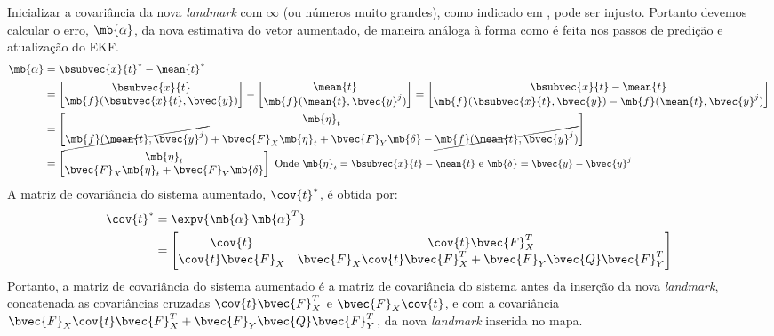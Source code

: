 Inicializar a covariância da nova \textit{landmark} com $\infty$ (ou 
números muito grandes), como indicado em 
\cite[p.~317]{bongard2006probabilistic}, pode ser injusto. Portanto devemos 
calcular o erro, $\mb{\alpha}$, da nova estimativa do vetor aumentado, de 
maneira análoga à forma como é feita nos passos de predição e atualização 
do EKF. 
\begin{equation}
\begin{aligned}
   \mb{\alpha} &= \bsubvec{x}{t}^* - \mean{t}^*\\
   &= \begin{bmatrix}
       \bsubvec{x}{t} \\ \mb{f}(\bsubvec{x}{t}, \bvec{y})
   \end{bmatrix} - \begin{bmatrix}
       \mean{t} \\ \mb{f}(\mean{t}, \bvec{y}^j)
   \end{bmatrix} = \begin{bmatrix}
       \bsubvec{x}{t} - \mean{t}\\
       \mb{f}(\bsubvec{x}{t}, \bvec{y}) - \mb{f}(\mean{t}, \bvec{y}^j)
   \end{bmatrix}\\
   &= \begin{bmatrix}
       \mb{\eta}_t \\
       \cancel{\mb{f}(\mean{t}, \bvec{y}^j)} + 
       \bvec{F}_X \mb{\eta}_t + \bvec{F}_Y \mb{\delta}
       - \cancel{\mb{f}(\mean{t}, \bvec{y}^j)}
   \end{bmatrix} \\
    &= \begin{bmatrix}
       \mb{\eta}_t \\
       \bvec{F}_X \mb{\eta}_t + \bvec{F}_Y \mb{\delta} 
   \end{bmatrix} \small\text{ Onde $\mb{\eta}_t = \bsubvec{x}{t} - \mean{t}$ e $\mb{\delta} = \bvec{y} - \bvec{y}^j$}
\end{aligned}
\end{equation}
A matriz de covariância do sistema aumentado, $\cov{t}^*$, é obtida por:
\renewcommand{\arraystretch}{1.5}
\begin{equation}
\begin{aligned}
  \cov{t}^* &= \expv{\mb{\alpha} \,\mb{\alpha}^T} \\
  &= \begin{bmatrix}
       \cov{t} & \cov{t} \bvec{F}_X^T\\
       \cov{t} \bvec{F}_X &  \bvec{F}_X \cov{t} \bvec{F}_X^T 
       + \bvec{F}_Y \bvec{Q} \bvec{F}_Y^T
    \end{bmatrix}
\end{aligned}
\end{equation}
\renewcommand{\arraystretch}{1}
Portanto, a matriz de covariância do sistema aumentado é a matriz de 
covariância do sistema antes da inserção da nova \textit{landmark}, 
concatenada as covariâncias cruzadas $\cov{t} \bvec{F}_X^T$ e $\bvec{F}_X \cov{t}$, e com a covariância $\bvec{F}_X \cov{t} \bvec{F}_X^T + \bvec{F}_Y 
\bvec{Q} \bvec{F}_Y^T$, da nova \textit{landmark} inserida no mapa. 

